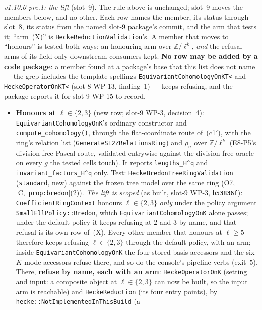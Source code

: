 \documentclass[11pt]{article}
\theoremstyle{remark}
\newcommand{\Z}{\mathbb{Z}}
\newcommand{\HA}[1]{[C,~\texttt{#1}]}      %
\begin{document}
\begin{enumerate}[label=(b\arabic*)]
  \begingroup\sloppy
  \emph{v1.10.0-pre.1: the lift} (slot~9). The rule above is unchanged; slot~9 moves the members
  below, and no other. Each row names the member, its status through slot~8, its status from the
  named slot-9 package's commit, and the arm that tests it; ``arm~(X)'' is
  \texttt{HeckeReductionValidation}'s. A member that moves to ``honours'' is tested both ways: an
  honouring arm over $\Z/\ell^k$, \emph{and} the refusal arms of its field-only downstream
  consumers kept. \textbf{No row may be added by a code package}: a member found at a package's
  base that this list does not name --- the grep includes the template spellings
  \texttt{EquivariantCohomologyOnKT<} and \texttt{HeckeOperatorOnKT<} (slot-8 WP-13, finding~1) ---
  keeps refusing, and the package reports it for slot-9 WP-15 to record.
  \begin{itemize}
  \item \textbf{Honours at $\ell\in\{2,3\}$} (new row; slot-9 WP-3, decision~4):
    \texttt{EquivariantCohomologyOnK}'s ordinary constructor and \texttt{compute\_cohomology()},
    through the flat-coordinate route of~(c1$'$), with the ring's relation list
    (\texttt{GenerateSL2ZRelationsRing}) and $\rho_n$ over $\Z/\ell^k$ (E8-P5's division-free
    Pascal route, validated entrywise against the division-free oracle on every $g$ the tested
    cells touch). It reports \texttt{lengths\_H\textasciicircum q} and
    \texttt{invariant\_factors\_H\textasciicircum q} only. Test:
    \texttt{HeckeBredonTreeRingValidation} (\texttt{standard}, new) against the frozen tree model
    over the same ring (O7, \HA{prop:bredon}(2)). \emph{The lift is scoped} (as built, slot-9
    WP-3, \texttt{b53836f}): \texttt{CoefficientRingContext} honours $\ell\in\{2,3\}$ \emph{only}
    under the policy argument \texttt{SmallEllPolicy::Bredon}, which \texttt{EquivariantCohomologyOnK}
    alone passes; under the default policy it keeps refusing at $2$ and $3$ by name, and that
    refusal is its own row of~(X). Every other member that honours at $\ell\ge5$ therefore keeps
    refusing $\ell\in\{2,3\}$ through the default policy, with an arm; inside
    \texttt{EquivariantCohomologyOnK} the four stored-basis accessors and the six $K$-mode
    accessors refuse there, and so do the console's pipeline verbs (exit~$5$). There,
    \textbf{refuse by name, each with an arm}: \texttt{HeckeOperatorOnK} (setting and input:
    a composite object at $\ell\in\{2,3\}$ can now be built, so the input arm is reachable) and
    \texttt{HeckeReduction} (its four entry points), by \texttt{hecke::NotImplementedInThisBuild} (a

\end{itemize}
\end{enumerate}
\end{document}
